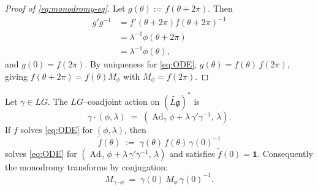 \documentclass[12pt]{article}
\begin{document}
\begin{proof}[Proof of \eqref{eq:monodromy-eq}]
    Let $g(\theta):=f(\theta+2\pi)$. Then
    \begin{align*}
        g' g^{-1} & = f'(\theta+2\pi) f(\theta+2\pi)^{-1} \\
                  & = \lambda^{-1}\phi(\theta+2\pi)       \\
                  & = \lambda^{-1}\phi(\theta),
    \end{align*}
    and $g(0)=f(2\pi)$. By uniqueness for \eqref{eq:ODE}, $g(\theta)=f(\theta)\,f(2\pi)$, giving
    $f(\theta+2\pi)=f(\theta)M_\phi$ with $M_\phi=f(2\pi)$.
\end{proof}

\begin{proposition}
    Let $\gamma\in LG$. The $LG$–coadjoint action on
    $(\widetilde{L\mathfrak g})^*$ is
    \[
        \gamma\cdot(\phi,\lambda) \;=\; (\operatorname{Ad}_\gamma\phi + \lambda\,\gamma'\gamma^{-1},\,\lambda).
    \]
    If $f$ solves \eqref{eq:ODE} for $(\phi,\lambda)$, then
    \begin{equation}\label{eq:ftilde}
        \tilde f(\theta) \;:=\; \gamma(\theta)\,f(\theta)\,\gamma(0)^{-1}
    \end{equation}
    solves \eqref{eq:ODE} for $(\operatorname{Ad}_\gamma\phi + \lambda\,\gamma'\gamma^{-1},\,\lambda)$
    and satisfies $\tilde f(0)=\mathbf{1}$.
    Consequently the monodromy transforms by conjugation:
    \begin{equation}\label{eq:monodromy-conj}
        M_{\gamma\cdot\phi} \;=\; \gamma(0)\,M_\phi\,\gamma(0)^{-1}.
    \end{equation}
\end{proposition}
\end{document}
